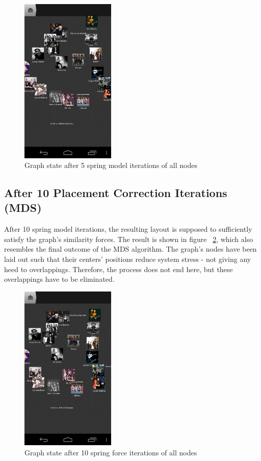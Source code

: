 \begin{figure}[H]
  \centering
    \includegraphics[width=0.4\textwidth]{figures/screen_mds_6_after_5_cleanup_iterations}
  \caption{Graph state after 5 spring model iterations of all nodes}
  \label{fig:screen_mds_6_after_5_cleanup_iterations}
\end{figure}

\newpage
\subsection{After 10 Placement Correction Iterations (MDS)}
\label{subsec:mds-after-ten-placement-iterations}

After 10 spring model iterations, the resulting layout is supposed to sufficiently satisfy the graph's similarity forces. The result is shown in figure ~\ref{fig:screen_mds_7_after_10_cleanup_iterations}, which also resembles the final outcome of the MDS algorithm. 
The graph's nodes have been laid out such that their centers' positions reduce system stress - not giving any heed to overlappings. Therefore, the process does not end here, but these overlappings have to be eliminated.

\begin{figure}[H]
  \centering
    \includegraphics[width=0.4\textwidth]{figures/screen_mds_7_after_10_cleanup_iterations}
  \caption{Graph state after 10 spring force iterations of all nodes}
  \label{fig:screen_mds_7_after_10_cleanup_iterations}
\end{figure}

